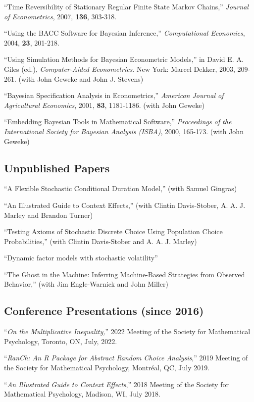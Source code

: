 \documentclass[12pt]{article}
\begin{document}
``Time Reversibility of Stationary Regular Finite State Markov Chains,''  {\it Journal of Econometrics},
2007,
{\bf 136}, 303-318.

``Using the BACC Software for Bayesian Inference,'' {\it Computational Economics},
2004,
{\bf 23}, 201-218.

``Using Simulation Methods for Bayesian Econometric Models,''  in  David E. A. Giles (ed.), {\it Computer-Aided Econometrics}.
New York: Marcel Dekker, 2003, 209-261. (with John Geweke and John J. Stevens)

``Bayesian Specification Analysis in Econometrics,''  {\it American Journal of Agricultural Economics},
2001,
{\bf 83}, 1181-1186. (with John Geweke)

``Embedding Bayesian Tools in Mathematical Software,''  {\it Proceedings of the International Society for Bayesian Analysis (ISBA)}, 
2000, 165-173.
 (with John Geweke)

\subsection*{Unpublished Papers}

``A Flexible Stochastic Conditional Duration Model,''
(with Samuel Gingras)

``An Illustrated Guide to Context Effects,''
(with Clintin Davis-Stober, A. A. J. Marley and Brandon Turner)

``Testing Axioms of Stochastic Discrete Choice Using Population Choice Probabilities,'' (with Clintin Davis-Stober and A. A. J. Marley)

``Dynamic factor models with stochastic volatility''

``The Ghost in the Machine: Inferring Machine-Based Strategies from Observed Behavior,'' (with Jim Engle-Warnick and John Miller)

\subsection*{Conference Presentations (since 2016)}

``{\it On the Multiplicative Inequality,}''
2022 Meeting of the Society for Mathematical Psychology,
Toronto, ON,
July, 2022.

``{\it RanCh: An R Package for Abstract Random Choice Analysis},''
2019 Meeting of the Society for Mathematical Psychology,
Montr\'eal, QC,
July 2019.

``{\it An Illustrated Guide to Context Effects},''
2018 Meeting of the Society for Mathematical Psychology,
Madison, WI,
July 2018.
\end{document}
